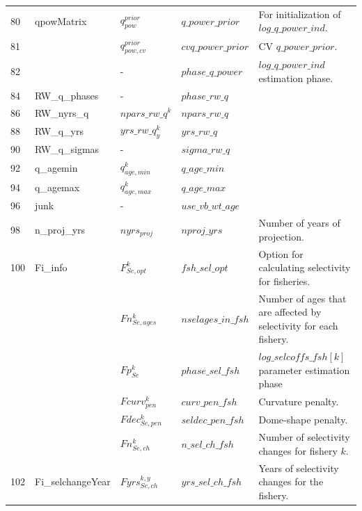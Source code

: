 \documentclass{article}
\begin{document}
\begin{table}[H]
\begin{tabular}{|| p{0.9cm} | p{4.0cm}  | p{1.9cm} | l | p{6cm} ||}
80 & qpowMatrix & $q^{prior}_{pow}$  & $q\_power\_prior$ & For initialization of $log\_q\_power\_ind$.\\ %
81 &            & $q^{prior}_{pow,cv}$ & $cvq\_power\_prior$ & CV $q\_power\_prior$.\\ %
82 &            &  - & $phase\_q\_power$  & $log\_q\_power\_ind$ estimation phase.\\ \hline
84 & RW\_q\_phases & -  & $phase\_rw\_q$ &\\ \hline
86 & RW\_nyrs\_q  & $npars\_rw\_q^k$   & $npars\_rw\_q$ &\\ \hline
88 & RW\_q\_yrs & $yrs\_rw\_q^k_y$  & $yrs\_rw\_q$ &\\ \hline
90 & RW\_q\_sigmas &  - & $sigma\_rw\_q$ &\\ \hline
92 & q\_agemin &  $q_{age,min}^k$ & $q\_age\_min$ &\\ \hline
94 & q\_agemax &   $q_{age,max}^k$ & $q\_age\_max$  &\\ \hline
96 & junk  & -  & $use\_vb\_wt\_age$  &\\ \hline
98 & n\_proj\_yrs &  $nyrs_{proj}$ & $nproj\_yrs$ & Number of years of projection.\\ \hline
100 & Fi\_info      &  $F^k_{Se,opt}$ & $fsh\_sel\_opt$  & Option for calculating selectivity for fisheries.\\ %
    &               & $Fn_{Se,ages}^k$  & $nselages\_in\_fsh$  & Number of ages that are affected by selectivity for each fishery.\\ %
    &               & $Fp_{Se}^k$  & $phase\_sel\_fsh$  & $log\_selcoffs\_fsh[k]$ parameter estimation phase\\ %
    &               &  $Fcurv_{pen}^k$ & $curv\_pen\_fsh$ & Curvature penalty.\\ %
    &               &  $Fdec_{Se,pen}^k$  & $seldec\_pen\_fsh$ & Dome-shape penalty.\\ %
    &               &  $Fn_{Se,ch}^k$ & $n\_sel\_ch\_fsh$ & Number of selectivity changes for fishery $k$.\\ \hline 
102 & Fi\_selchangeYear &  $Fyrs_{Se,ch}^{k,y}$ & $yrs\_sel\_ch\_fsh$ & Years of selectivity changes for the fishery.\\ \hline

\end{tabular}
\end{table}
\end{document}
